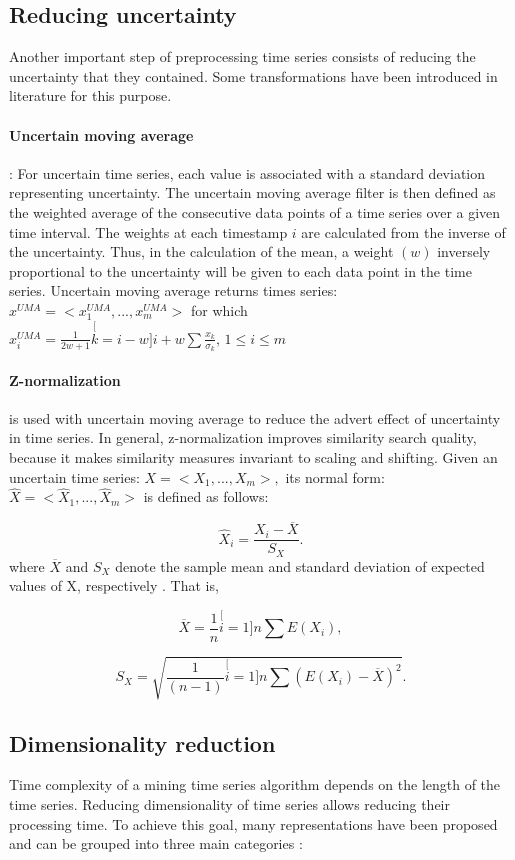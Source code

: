 \subsection{Reducing uncertainty}
Another important step of preprocessing time series consists of reducing the uncertainty that they contained. Some transformations have been introduced in literature for this purpose.


\paragraph{Uncertain moving average} :  For uncertain time series, each value is associated with a standard deviation representing uncertainty. The uncertain moving average filter is then defined as the weighted average of the consecutive data points of a time series over a given time interval. The weights at each timestamp $i$ are calculated from the inverse of the uncertainty. Thus, in the calculation of the mean, a weight $(w)$ inversely proportional to the uncertainty will be given to each data point in the time series. Uncertain moving average returns times series: $x^{UMA}=<x_{1}^{UMA},...,x_{m}^{UMA}>$ for which $x_{i}^{UMA}=\frac{1}{2w+1}\stackrel[k=i-w]{i+w}{\sum}\frac{x_{k}}{\sigma_{k}},\,1\leq i\leq m$ \cite{Orang2015}

\paragraph{Z-normalization} is used with uncertain moving average to reduce the advert effect of uncertainty in time series. In general, z-normalization improves similarity search quality, because it makes similarity measures invariant to scaling and shifting. Given an uncertain time series: $X=<X_{1},...,X_{m}>,$ its normal form: $\hat{X}=<\hat{X}_{1},...,\hat{X}_{m}>$ is defined as follows: 

\[
\ensuremath{\hat{X}_{i}}=\frac{X_{i}-\overline{X}}{S_{X}}.
\]
where $\overline{X}$ and $S_{X}$ denote the sample mean and standard deviation of expected values of X, respectively \cite{Orang2015}. That is,

\[
\overline{X}=\frac{1}{n}\stackrel[i=1]{n}{\sum}E(X_{i}),
\]

\[
S_{X}=\sqrt{\frac{1}{(n-1)}\stackrel[i=1]{n}{\sum}(E(X_{i})-\overline{X})^{2}}.
\]

\subsection{Dimensionality reduction}
Time complexity of a mining time series algorithm depends on the length of the time series. Reducing dimensionality of time series allows reducing their processing time. To achieve this goal, many representations have been proposed and can be grouped into three main categories : 

